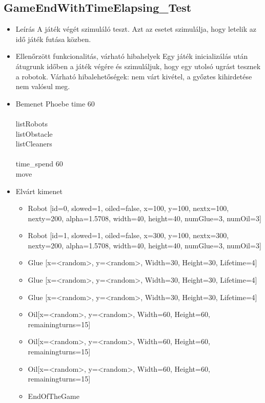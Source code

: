 \subsection{GameEndWithTimeElapsing\_Test}
\begin{itemize}
\item Leírás\newline
A játék végét szimuláló teszt. Azt az esetet szimulálja, hogy letelik az idő játék futása közben. 
\item Ellenőrzött funkcionalitás, várható hibahelyek
Egy játék inicializálás után átugrunk időben a játék végére és szimuláljuk, hogy egy utolsó ugrást tesznek a robotok. Várható hibalehetőségek: nem várt kivétel, a győztes kihirdetése nem valósul meg.
\item Bemenet\newline
Phoebe time 60\\
\\
listRobots\\
listObstacle\\
listCleaners\\
\\
time\_spend 60\\
move\\
\item Elvárt kimenet
\begin{itemize}
\item Robot [id=0, slowed=1, oiled=false, x=100, y=100, nextx=100, nexty=200, alpha=1.5708, width=40, height=40, numGlue=3, numOil=3]
\item Robot [id=1, slowed=1, oiled=false, x=300, y=100, nextx=300, nexty=200, alpha=1.5708, width=40, height=40, numGlue=3, numOil=3]
\item Glue [x=<random>, y=<random>, Width=30, Height=30, Lifetime=4]
\item Glue [x=<random>, y=<random>, Width=30, Height=30, Lifetime=4]
\item Glue [x=<random>, y=<random>, Width=30, Height=30, Lifetime=4]
\item Oil[x=<random>, y=<random>, Width=60, Height=60, remainingturns=15]
\item Oil[x=<random>, y=<random>, Width=60, Height=60, remainingturns=15]
\item Oil[x=<random>, y=<random>, Width=60, Height=60, remainingturns=15]
\item EndOfTheGame
\end{itemize}

\end{itemize}

